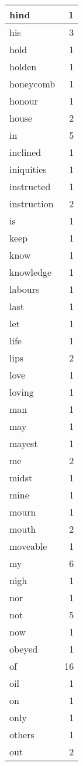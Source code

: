 \begin{center}
\begin{longtable}{l|r}
hind & 1\\ \hline 
his & 3\\ \hline 
hold & 1\\ \hline 
holden & 1\\ \hline 
honeycomb & 1\\ \hline 
honour & 1\\ \hline 
house & 2\\ \hline 
in & 5\\ \hline 
inclined & 1\\ \hline 
iniquities & 1\\ \hline 
instructed & 1\\ \hline 
instruction & 2\\ \hline 
is & 1\\ \hline 
keep & 1\\ \hline 
know & 1\\ \hline 
knowledge & 1\\ \hline 
labours & 1\\ \hline 
last & 1\\ \hline 
let & 1\\ \hline 
life & 1\\ \hline 
lips & 2\\ \hline 
love & 1\\ \hline 
loving & 1\\ \hline 
man & 1\\ \hline 
may & 1\\ \hline 
mayest & 1\\ \hline 
me & 2\\ \hline 
midst & 1\\ \hline 
mine & 1\\ \hline 
mourn & 1\\ \hline 
mouth & 2\\ \hline 
moveable & 1\\ \hline 
my & 6\\ \hline 
nigh & 1\\ \hline 
nor & 1\\ \hline 
not & 5\\ \hline 
now & 1\\ \hline 
obeyed & 1\\ \hline 
of & 16\\ \hline 
oil & 1\\ \hline 
on & 1\\ \hline 
only & 1\\ \hline 
others & 1\\ \hline 
out & 2\\ \hline 

\end{longtable}
\end{center}
